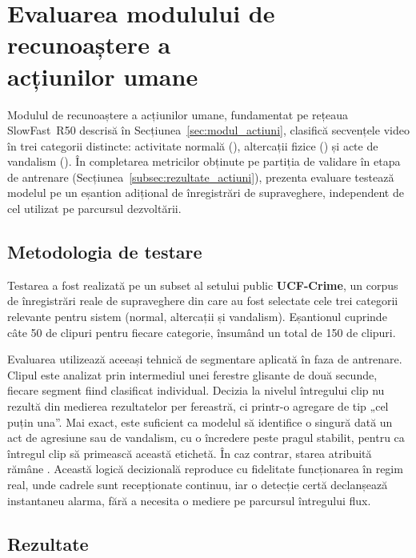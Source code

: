 \documentclass[../../main.tex]{subfiles}
\begin{document}
\section{Evaluarea modulului de recunoaștere a \\ acțiunilor umane}
\label{sec:eval_actiuni}

Modulul de recunoaștere a acțiunilor umane, fundamentat pe rețeaua SlowFast~R50 descrisă în Secțiunea~\ref{sec:modul_actiuni}, clasifică secvențele video în trei categorii distincte: activitate normală (), altercații fizice () și acte de vandalism (). În completarea metricilor obținute pe partiția de validare în etapa de antrenare (Secțiunea~\ref{subsec:rezultate_actiuni}), prezenta evaluare testează modelul pe un eșantion adițional de înregistrări de supraveghere, independent de cel utilizat pe parcursul dezvoltării.

\subsection{Metodologia de testare}
\label{subsec:metodologie_actiuni}

Testarea a fost realizată pe un subset al setului public \textbf{UCF-Crime}, un corpus de înregistrări reale de supraveghere din care au fost selectate cele trei categorii relevante pentru sistem (normal, altercații și vandalism). Eșantionul cuprinde câte 50 de clipuri pentru fiecare categorie, însumând un total de 150 de clipuri.

Evaluarea utilizează aceeași tehnică de segmentare aplicată în faza de antrenare. Clipul este analizat prin intermediul unei ferestre glisante de două secunde, fiecare segment fiind clasificat individual. Decizia la nivelul întregului clip nu rezultă din medierea rezultatelor per fereastră, ci printr-o agregare de tip „cel puțin una”. Mai exact, este suficient ca modelul să identifice o singură dată un act de agresiune sau de vandalism, cu o încredere peste pragul stabilit, pentru ca întregul clip să primească această etichetă. În caz contrar, starea atribuită rămâne . Această logică decizională reproduce cu fidelitate funcționarea în regim real, unde cadrele sunt recepționate continuu, iar o detecție certă declanșează instantaneu alarma, fără a necesita o mediere pe parcursul întregului flux.

\subsection{Rezultate}
\label{subsec:actiuni_rezultate}
\end{document}
